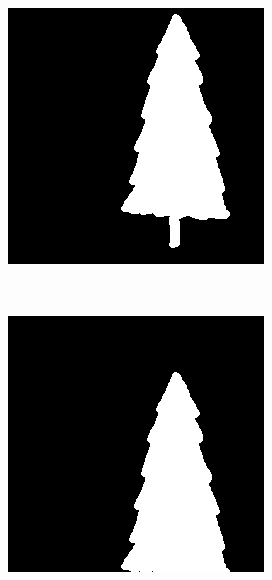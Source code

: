 \documentclass[
	article,			%
	11pt,				%
	oneside,			%
	a4paper,			%
	english,			%
	brazil,				%
	sumario=tradicional
	]{abntex2}
\begin{document}
\begin{figure}
\begin{subfigure}[b]{0.3\textwidth}
				\caption{}
                \label{fig:TransT1}
        \end{subfigure}
        ~
        \begin{subfigure}[b]{0.3\textwidth}
                \includegraphics[width=\textwidth]{imagens/ex1/imageT2.png}
                \caption{}
                \label{fig:TransT2}
        \end{subfigure}
        ~
        \begin{subfigure}[b]{0.3\textwidth}
                \includegraphics[width=\textwidth]{imagens/ex1/imageT3.png}

\end{subfigure}
\end{figure}
\end{document}
